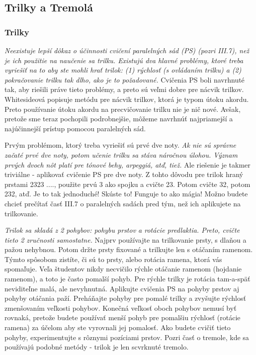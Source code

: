 \subsection{Trilky a Tremolá}
\subsubsection{Trilky}
\emph{Neexistuje lepší dôkaz o účinnosti cvičení paralelných sád (PS) (pozri III.7), než je ich použitie na naučenie sa trilku. Existujú dva hlavné problémy, ktoré treba vyriešiť na to aby ste mohli hrať trilok: (1) rýchlosť (s ovládaním trilku) a (2) pokračovanie trilku tak dlho, ako je to požadované.} Cvičenia PS boli navrhnuté tak, aby riešili práve tieto problémy, a preto sú veľmi dobre pre nácvik trilkov. Whitesideová popisuje metódu pre nácvik trilkov, ktorá je typom útoku akordu. Preto používanie útoku akordu na precvičovanie trilku nie je nič nové. Avšak, pretože sme teraz pochopili podrobnejšie, môžeme navrhnúť najpriamejší a najúčinnejší prístup pomocou paralelných sád.

Prvým problémom, ktorý treba vyriešiť sú prvé dve noty. \emph{Ak nie sú správne začaté prvé dve noty, potom učenie trilku sa stáva náročnou úlohou. Význam prvých dvoch nôt platí pre tónové behy, arpeggiá, atď, tiež.} Ale riešenie je takmer triviálne - aplikovať cvičenie PS pre dve noty. Z tohto dôvodu pre trilok hraný prstami 2323 ...., použite prvú 3 ako spojku a cvičte 23. Potom cvičte 32, potom 232, atď. Je to tak jednoduché! Skúste to! Funguje to ako mágia! Možno budete chcieť prečítať časť III.7 o paralelných sadách pred tým, než ich aplikujete na trilkovanie. 

\emph{Trilok sa skladá z 2 pohybov: pohybu prstov a rotácie predlaktia. Preto, cvičte tieto 2 zručnosti samostatne.} Najprv používajte na trilkovanie prsty, s dlaňou a pažou nehybnou. Potom držte prsty fixované a trilkujte len s otáčaním ramenom. Týmto spôsobom zistíte, či sú to prsty, alebo rotácia ramena, ktorá vás spomaľuje. Veľa študentov nikdy necvičilo rýchle otáčanie ramenom (hojdanie ramenom), a toto je často pomalší pohyb. Pre rýchle trilky je rotácia tam-a-späť neviditeľne malá, ale nevyhnutná. Aplikujte cvičenia PS na pohyby prstov aj pohyby otáčania paží. Preháňajte pohyby pre pomalé trilky a zvyšujte rýchlosť zmenšovaním veľkosti pohybov. Konečná veľkosť oboch pohybov nemusí byť rovnaká, pretože budete používať menší pohyb pre pomalšiu rýchlosť (rotácie ramena) za účelom aby ste vyrovnali jej pomalosť. Ako budete cvičiť tieto pohyby, experimentujte s rôznymi pozíciami prstov. Pozri časť o tremole, kde sa používajú podobné metódy - trilok je len scvrknuté tremolo.

